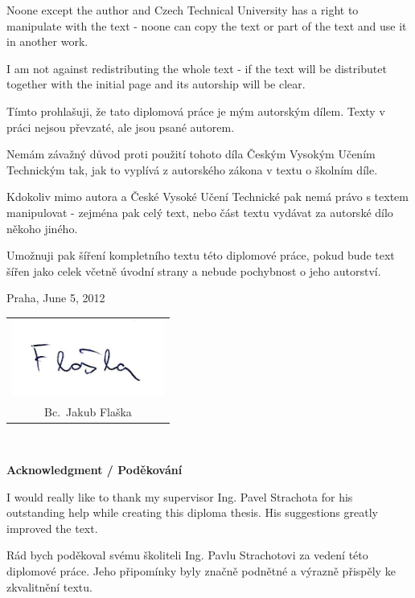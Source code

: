 \documentclass[a4paper,12pt]{report}	%
\newcommand{\autor}{Bc.~Jakub Flaška}
\begin{document}
Noone except the author and Czech Technical University has a right to manipulate with the text - noone can copy the text or part of the text and use it in another work.

I am not against redistributing the whole text - if the text will be distributet together with the initial page and its autorship will be clear.

\vspace{10mm}

Tímto prohlašuji, že tato diplomová práce je mým autorským dílem. Texty v práci nejsou převzaté, ale jsou psané autorem.

Nemám závažný důvod proti použití tohoto díla Českým Vysokým Učením Technickým tak, jak to vyplívá z autorského zákona v textu o školním díle. 

Kdokoliv mimo autora a České Vysoké Učení Technické pak nemá právo s textem manipulovat - zejména pak celý text, nebo část textu vydávat za autorské dílo někoho jiného.

Umožnuji pak šíření kompletního textu této diplomové práce, pokud bude text šířen jako celek včetně úvodní strany a nebude pochybnost o jeho autorství. 

\vspace{10mm}Praha, June 5, 2012\hfill
	\begin{tabular}{c}
	\includegraphics[width=50mm]{Text/IMG/podpis.jpg}\\ 
	\autor
	\end{tabular}


\newpage
\thispagestyle{empty}

~
\vfill %

{\bf Acknowledgment / Poděkování}

\vspace{5mm} %

I would really like to thank my supervisor Ing. Pavel Strachota for his outstanding help while creating this diploma thesis. His suggestions greatly improved the text.

Rád bych poděkoval svému školiteli Ing. Pavlu Strachotovi za vedení této diplomové práce. Jeho připomínky byly značně podnětné a výrazně přispěly ke zkvalitnění textu.
\end{document}
